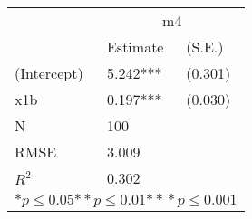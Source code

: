 \begin{tabular}{*{3}{l}}
\hline
                  & \multicolumn{2}{c}{m4}   \tabularnewline
                   &Estimate  &(S.E.)  \tabularnewline
 \hline
 \hline
   (Intercept)     &5.242***   &   (0.301) \tabularnewline
   x1b             &0.197***   &   (0.030) \tabularnewline
 \hline
 N                 &100       &        \tabularnewline
 RMSE             &3.009         & \tabularnewline
 $R^2$             &0.302         & \tabularnewline
 \hline
\hline
 
 \multicolumn{3}{c}{${*  p}\le 0.05$${*\!\!*  p}\le 0.01$${*\!\!*\!\!*  p}\le 0.001$}\tabularnewline
 \end{tabular}